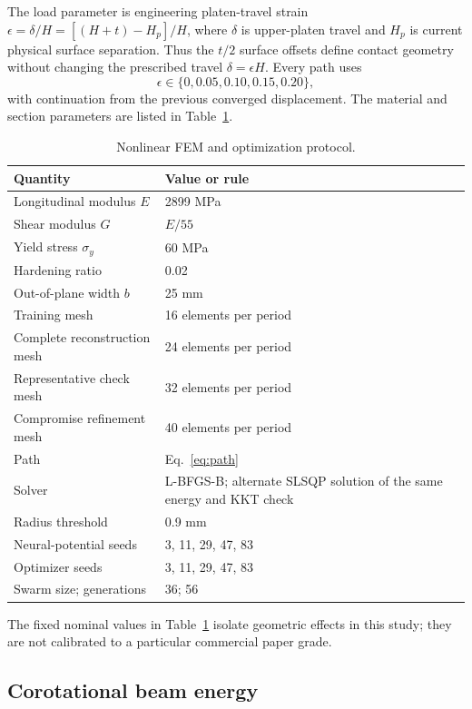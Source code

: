 \documentclass[11pt]{article}
\begin{document}
The load parameter is engineering platen-travel strain
$\epsilon=\delta/H=[(H+t)-H_p]/H$, where $\delta$ is upper-platen travel and $H_p$ is current physical surface separation. Thus the $t/2$ surface offsets define contact geometry without changing the prescribed travel $\delta=\epsilon H$. Every path uses
\begin{equation}
\epsilon\in\{0,0.05,0.10,0.15,0.20\},
\label{eq:path}
\end{equation}
with continuation from the previous converged displacement. The material and section parameters are listed in Table~\ref{tab:fem_protocol}.

\begin{table}[t]
\centering\small
\caption{Nonlinear FEM and optimization protocol.}
\label{tab:fem_protocol}
\begin{tabularx}{\textwidth}{lX}
\toprule
Quantity & Value or rule \\
\midrule
Longitudinal modulus $E$ & 2899 MPa \\
Shear modulus $G$ & $E/55$ \\
Yield stress $\sigma_y$ & 60 MPa \\
Hardening ratio & 0.02 \\
Out-of-plane width $b$ & 25 mm \\
Training mesh & 16 elements per period \\
Complete reconstruction mesh & 24 elements per period \\
Representative check mesh & 32 elements per period \\
Compromise refinement mesh & 40 elements per period \\
Path & Eq.~\eqref{eq:path} \\
Solver & L-BFGS-B; alternate SLSQP solution of the same energy and KKT check \\
Radius threshold & 0.9 mm \\
Neural-potential seeds & 3, 11, 29, 47, 83 \\
Optimizer seeds & 3, 11, 29, 47, 83 \\
Swarm size; generations & 36; 56 \\
\bottomrule
\end{tabularx}
\end{table}

The fixed nominal values in Table~\ref{tab:fem_protocol} isolate geometric effects in this study; they are not calibrated to a particular commercial paper grade.

\subsection{Corotational beam energy}
\end{document}
